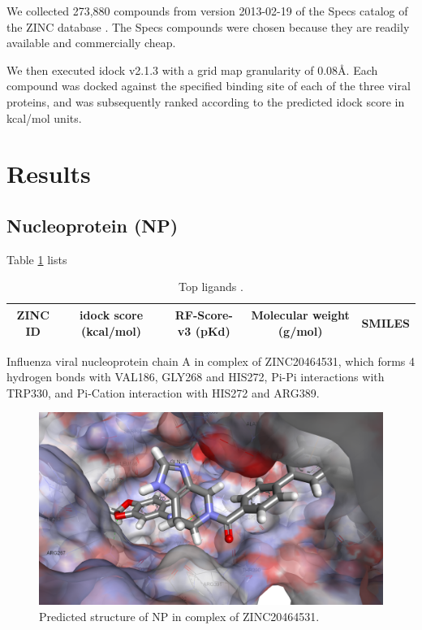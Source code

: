 We collected 273,880 compounds from version 2013-02-19 of the Specs catalog of the ZINC database \citep{532,1178}. The Specs compounds were chosen because they are readily available and commercially cheap.

We then executed idock v2.1.3 with a grid map granularity of 0.08\AA. Each compound was docked against the specified binding site of each of the three viral proteins, and was subsequently ranked according to the predicted idock score in kcal/mol units.

\section{Results}

\subsection{Nucleoprotein (NP)}

Table \ref{influenza:2IQH-Hits} lists

\begin{table}
\caption{Top ligands .}
\label{influenza:2IQH-Hits}
\begin{tabular}{ccccl}
\hline
ZINC ID & idock score (kcal/mol) & RF-Score-v3 (pKd) & Molecular weight (g/mol) & SMILES\\
\hline
\hline
\end{tabular}
\end{table}

Influenza viral nucleoprotein chain A in complex of ZINC20464531, which forms 4 hydrogen bonds with VAL186, GLY268 and HIS272, Pi-Pi interactions with TRP330, and Pi-Cation interaction with HIS272 and ARG389.

\begin{figure}
\centering
\includegraphics[width=\linewidth]{../influenza/2IQH-ZINC20464531.png}
\caption{Predicted structure of NP in complex of ZINC20464531.}
\label{influenza:2IQH-ZINC20464531}
\end{figure}

